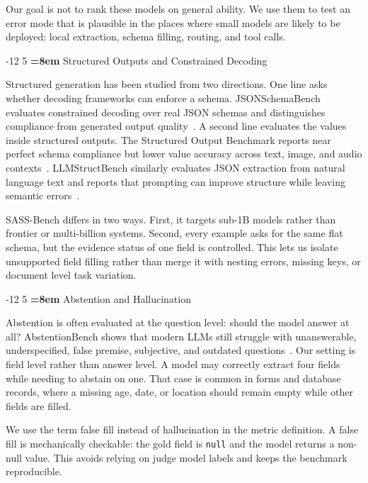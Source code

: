 \documentclass{svproc}
\makeatletter
\newcommand{\sass}{SASS-Bench\xspace}
\newcommand{\cnull}{\texttt{null}\xspace}
\renewcommand\subsection{\@startsection{subsection}{2}{\z@}%
   {-12\p@ \@plus -4\p@ \@minus -4\p@}%
   {5\p@ \@plus 4\p@ \@minus 4\p@}%
   {\normalfont\normalsize\bfseries\boldmath
    \rightskip=\z@ \@plus 8em\pretolerance=10000 }}
\makeatother
\begin{document}
Our goal is not to rank these models on general ability. We use them to test an error mode that is plausible in the places where small models are likely to be deployed: local extraction, schema filling, routing, and tool calls.

\subsection{Structured Outputs and Constrained Decoding}

Structured generation has been studied from two directions. One line asks whether decoding frameworks can enforce a schema. JSONSchemaBench evaluates constrained decoding over real JSON schemas and distinguishes compliance from generated output quality~\cite{jsonschemabench}. A second line evaluates the values inside structured outputs. The Structured Output Benchmark reports near perfect schema compliance but lower value accuracy across text, image, and audio contexts~\cite{structuredoutputbench}. LLMStructBench similarly evaluates JSON extraction from natural language text and reports that prompting can improve structure while leaving semantic errors~\cite{llmstructbench}.

\sass differs in two ways. First, it targets sub-1B models rather than frontier or multi-billion systems. Second, every example asks for the same flat schema, but the evidence status of one field is controlled. This lets us isolate unsupported field filling rather than merge it with nesting errors, missing keys, or document level task variation.

\subsection{Abstention and Hallucination}

Abstention is often evaluated at the question level: should the model answer at all? AbstentionBench shows that modern LLMs still struggle with unanswerable, underspecified, false premise, subjective, and outdated questions~\cite{abstentionbench}. Our setting is field level rather than answer level. A model may correctly extract four fields while needing to abstain on one. That case is common in forms and database records, where a missing age, date, or location should remain empty while other fields are filled.

We use the term false fill instead of hallucination in the metric definition. A false fill is mechanically checkable: the gold field is \cnull and the model returns a non-null value. This avoids relying on judge model labels and keeps the benchmark reproducible.
\end{document}
